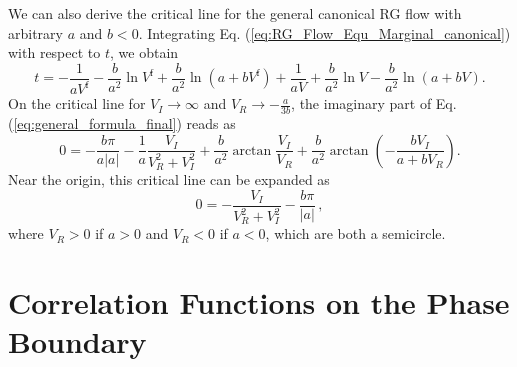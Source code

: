 \documentclass[aps,prl,twocolumn,superscriptaddress]{revtex4-1}
\begin{document}
\begin{bibunit}
We can also derive the critical line for the general canonical RG flow with arbitrary $a$ and $b<0$. Integrating Eq. (\ref{eq:RG_Flow_Equ_Marginal_canonical}) with respect to $t$, we obtain
\begin{equation}
	t=-\frac{1}{a V^{\mathrm{f}}}-\frac{b}{a^2}\ln{V^\mathrm{f}}+\frac{b}{a^2}\ln{(a+b V^\mathrm{f})}+\frac{1}{a V}+\frac{b}{a^2}\ln{V}-\frac{b}{a^2}\ln{(a+b V)}.
	\label{eq:general_formula_final}
\end{equation}
On the critical line for $V_I\to\infty$ and $V_R\to-\frac{a}{3b}$, the imaginary part of Eq. (\ref{eq:general_formula_final}) reads as 
\begin{equation}
	0=-\frac{b\pi}{a|a|}-\frac{1}{a}\frac{V_I}{V_R^2+V_I^2}+\frac{b}{a^2}\arctan{\frac{V_I}{V_R}}+\frac{b}{a^2}\arctan{(-\frac{b V_I}{a+b V_R})}.
	\label{eq:imaginary_part_boundary}
\end{equation}
Near the origin, this critical line can be expanded as 
\begin{equation}
	0=-\frac{V_I}{V_R^2+V_I^2}-\frac{b\pi}{|a|}\,,%
\end{equation}
where $V_R>0$ if $a>0$ and $V_R<0$ if $a<0$, which are both a semicircle.

\section{Correlation Functions on the Phase Boundary}\label{SectionOn}


\end{bibunit}
\end{document}
